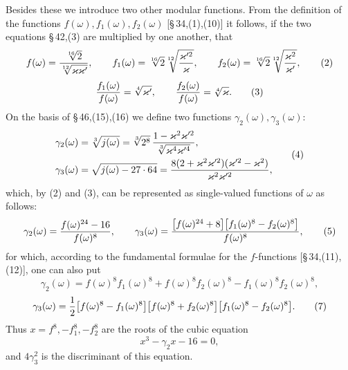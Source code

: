 \documentclass[11pt]{article}
\begin{document}
Besides these we introduce two other modular functions. From the definition of the functions $f(\omega),f_1(\omega),f_2(\omega)$ [\S\,34,(1),(10)] it follows, if the two equations \S\,42,(3) are multiplied by one another, that
\begin{equation}
f(\omega)={\sqrt[16]{2}\over\sqrt[12]{\varkappa\varkappa'}},
\qquad
f_1(\omega)=\sqrt[16]{2}\sqrt[12]{\varkappa'^2\over\varkappa},
\qquad
f_2(\omega)=\sqrt[16]{2}\sqrt[12]{\varkappa^2\over\varkappa'},
\tag{2}
\end{equation}
\begin{equation}
{f_1(\omega)\over f(\omega)}=\sqrt[4]{\varkappa'},
\qquad
{f_2(\omega)\over f(\omega)}=\sqrt[4]{\varkappa}.
\tag{3}
\end{equation}
On the basis of \S\,46,(15),(16) we define two functions $\gamma_2(\omega),\gamma_3(\omega)$:
\begin{equation}
\begin{aligned}
\gamma_2(\omega)&=\sqrt[3]{j(\omega)}
=\sqrt[3]{2^8}\,{1-\varkappa^2\varkappa'^2\over\sqrt[3]{\varkappa^4\varkappa'^4}},\\
\gamma_3(\omega)&=\sqrt{j(\omega)-27\cdot64}
={8(2+\varkappa^2\varkappa'^2)(\varkappa'^2-\varkappa^2)\over\varkappa^2\varkappa'^2},
\end{aligned}
\tag{4}
\end{equation}
which, by (2) and (3), can be represented as single-valued functions of $\omega$ as follows:
\begin{equation}
\gamma_2(\omega)={f(\omega)^{24}-16\over f(\omega)^8},
\qquad
\gamma_3(\omega)={\bigl[f(\omega)^{24}+8\bigr]\bigl[f_1(\omega)^8-f_2(\omega)^8\bigr]\over f(\omega)^8},
\tag{5}
\end{equation}
for which, according to the fundamental formulae for the $f$-functions [\S\,34,(11),(12)], one can also put
\begin{equation}
\gamma_2(\omega)=f(\omega)^8f_1(\omega)^8+f(\omega)^8f_2(\omega)^8-f_1(\omega)^8f_2(\omega)^8,
\tag{6}
\end{equation}
\begin{equation}
\gamma_3(\omega)={1\over2}\bigl[f(\omega)^8-f_1(\omega)^8\bigr]
\bigl[f(\omega)^8+f_2(\omega)^8\bigr]
\bigl[f_1(\omega)^8-f_2(\omega)^8\bigr].
\tag{7}
\end{equation}
Thus $x=f^8,-f_1^8,-f_2^8$ are the roots of the cubic equation
\begin{equation}
x^3-\gamma_2x-16=0,
\tag{8}
\end{equation}
and $4\gamma_3^2$ is the discriminant of this equation.
\end{document}
